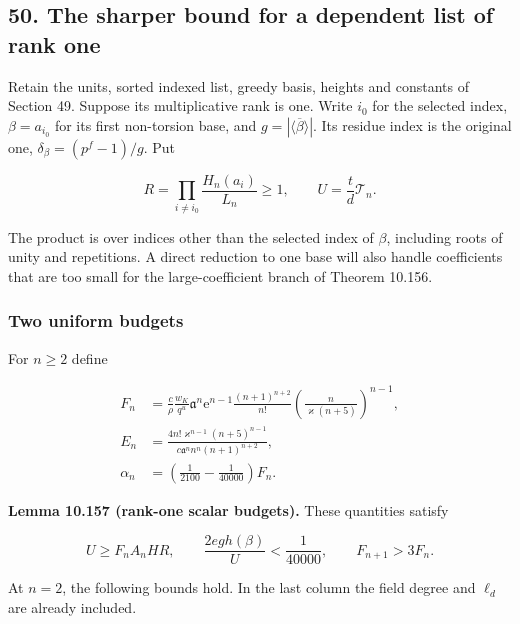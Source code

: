 \documentclass[
  11pt,
  a4paper,
]{article}
\begin{document}
\subsection{50. The sharper bound for a dependent list of rank
one}\label{the-sharper-bound-for-a-dependent-list-of-rank-one}

Retain the units, sorted indexed list, greedy basis, heights and
constants of Section 49. Suppose its multiplicative rank is one. Write
\(i_0\) for the selected index, \(\beta=a_{i_0}\) for its first
non-torsion base, and \(g=|\langle\overline\beta\rangle|\). Its residue
index is the original one, \(\delta_\beta=(p^f-1)/g\). Put

\[
R=\prod_{i\ne i_0}\frac{H_n(a_i)}{L_n}\ge1,
\qquad U=\frac{t}{d}\mathcal T_n.
\tag{10.490}
\]

The product is over indices other than the selected index of \(\beta\),
including roots of unity and repetitions. A direct reduction to one base
will also handle coefficients that are too small for the
large-coefficient branch of Theorem 10.156.

\subsubsection{Two uniform budgets}\label{two-uniform-budgets}

For \(n\ge2\) define

\[
\begin{aligned}
F_n&=\frac c\rho\frac{w_K}{q^u}\mathfrak a^n\mathrm e^{n-1}
\frac{(n+1)^{n+2}}{n!}
\left(\frac{n}{\varkappa(n+5)}\right)^{n-1},\\
E_n&=\frac{4n!\varkappa^{n-1}(n+5)^{n-1}}
{c\mathfrak a^n n^n(n+1)^{n+2}},\\
\alpha_n&=\left(\frac1{2100}-\frac1{40000}\right)F_n.
\end{aligned}
\tag{10.491}
\]

\textbf{Lemma 10.157 (rank-one scalar budgets).} These quantities
satisfy

\[
U\ge F_nA_nHR,
\qquad \frac{2eg h(\beta)}U<\frac1{40000},
\qquad F_{n+1}>3F_n.
\tag{10.492}
\]

At \(n=2\), the following bounds hold. In the last column the field
degree and \(\ell_d\) are already included.
\end{document}
